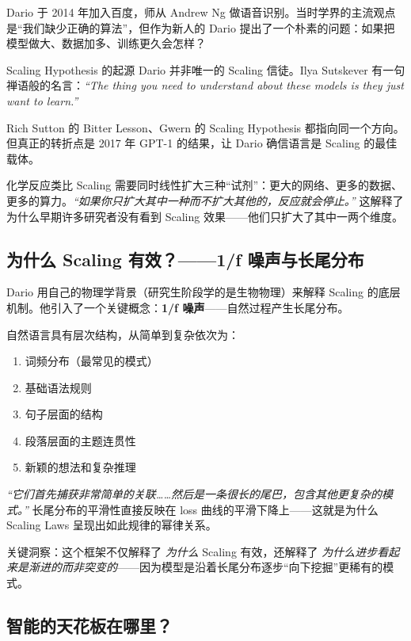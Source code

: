 \documentclass[a4paper]{article}
\begin{document}
Dario 于 2014 年加入百度，师从 Andrew Ng 做语音识别。当时学界的主流观点是``我们缺少正确的算法''，但作为新人的 Dario 提出了一个朴素的问题：如果把模型做大、数据加多、训练更久会怎样？

\begin{knowledgebox}{Scaling Hypothesis 的起源}
Dario 并非唯一的 Scaling 信徒。Ilya Sutskever 有一句禅语般的名言：\textit{``The thing you need to understand about these models is they just want to learn.''}

Rich Sutton 的 Bitter Lesson、Gwern 的 Scaling Hypothesis 都指向同一个方向。但真正的转折点是 2017 年 GPT-1 的结果，让 Dario 确信语言是 Scaling 的最佳载体。
\end{knowledgebox}

\begin{importantbox}{化学反应类比}
Scaling 需要同时线性扩大三种``试剂''：更大的网络、更多的数据、更多的算力。\textit{``如果你只扩大其中一种而不扩大其他的，反应就会停止。''} 这解释了为什么早期许多研究者没有看到 Scaling 效果——他们只扩大了其中一两个维度。
\end{importantbox}

\subsection{为什么 Scaling 有效？——1/f 噪声与长尾分布}

Dario 用自己的物理学背景（研究生阶段学的是生物物理）来解释 Scaling 的底层机制。他引入了一个关键概念：\textbf{1/f 噪声}——自然过程产生长尾分布。

自然语言具有层次结构，从简单到复杂依次为：
\begin{enumerate}
    \item 词频分布（最常见的模式）
    \item 基础语法规则
    \item 句子层面的结构
    \item 段落层面的主题连贯性
    \item 新颖的想法和复杂推理
\end{enumerate}

\textit{``它们首先捕获非常简单的关联……然后是一条很长的尾巴，包含其他更复杂的模式。''} 长尾分布的平滑性直接反映在 loss 曲线的平滑下降上——这就是为什么 Scaling Laws 呈现出如此规律的幂律关系。

关键洞察：这个框架不仅解释了 \textit{为什么} Scaling 有效，还解释了 \textit{为什么进步看起来是渐进的而非突变的}——因为模型是沿着长尾分布逐步``向下挖掘''更稀有的模式。

\subsection{智能的天花板在哪里？}
\end{document}
